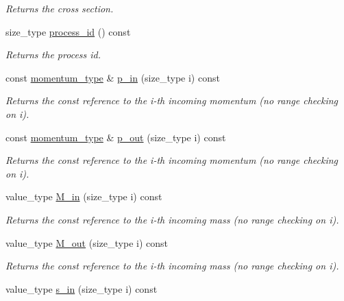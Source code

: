 \begin{DoxyCompactItemize}
\begin{DoxyCompactList}\small\item\em Returns the cross section. \end{DoxyCompactList}\item 
\hypertarget{a00430_a56d70495e4d75f6a59d719c11fd56129}{size\-\_\-type \hyperlink{a00430_a56d70495e4d75f6a59d719c11fd56129}{process\-\_\-id} () const }\label{a00430_a56d70495e4d75f6a59d719c11fd56129}

\begin{DoxyCompactList}\small\item\em Returns the process id. \end{DoxyCompactList}\item 
const \hyperlink{a00559}{momentum\-\_\-type} \& \hyperlink{a00430_a0f2d060d8fcaf550dc549107de16a117}{p\-\_\-in} (size\-\_\-type i) const 
\begin{DoxyCompactList}\small\item\em Returns the const reference to the i-\/th incoming momentum (no range checking on i). \end{DoxyCompactList}\item 
const \hyperlink{a00559}{momentum\-\_\-type} \& \hyperlink{a00430_ac83c742399331e972df1be65c587940e}{p\-\_\-out} (size\-\_\-type i) const 
\begin{DoxyCompactList}\small\item\em Returns the const reference to the i-\/th incoming momentum (no range checking on i). \end{DoxyCompactList}\item 
value\-\_\-type \hyperlink{a00430_a49db45a3fa01af92dab21cecce0934e7}{M\-\_\-in} (size\-\_\-type i) const 
\begin{DoxyCompactList}\small\item\em Returns the const reference to the i-\/th incoming mass (no range checking on i). \end{DoxyCompactList}\item 
value\-\_\-type \hyperlink{a00430_ac7725a8b3a39b0313e117613e9716337}{M\-\_\-out} (size\-\_\-type i) const 
\begin{DoxyCompactList}\small\item\em Returns the const reference to the i-\/th incoming mass (no range checking on i). \end{DoxyCompactList}\item 
\hypertarget{a00430_a16d207fe275c80737368224ac03b0284}{value\-\_\-type \hyperlink{a00430_a16d207fe275c80737368224ac03b0284}{s\-\_\-in} (size\-\_\-type i) const }\label{a00430_a16d207fe275c80737368224ac03b0284}


\end{DoxyCompactItemize}
